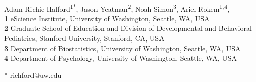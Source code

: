 \documentclass[10pt,letterpaper]{article}
\begin{document}
\vspace*{0.2in}

\begin{flushleft}
{\Large
\textbf{} %
}
\newline
\\
Adam Richie-Halford\textsuperscript{1*},
Jason Yeatman\textsuperscript{2},
Noah Simon\textsuperscript{3},
Ariel Rokem\textsuperscript{1,4},
\\
\bigskip
\textbf{1} eScience Institute, University of Washington, Seattle, WA, USA
\\
\textbf{2} Graduate School of Education and Division of Developmental and Behavioral Pediatrics, Stanford University, Stanford, CA, USA
\\
\textbf{3} Department of Biostatistics, University of Washington, Seattle, WA, USA
\\
\textbf{4} Department of Psychology, University of Washington, Seattle, WA, USA
\\
\bigskip

* richford@uw.edu

\end{flushleft}

\newcommand*{\alsLRatio}{$0.21$}
\newcommand*{\whLRatio}{$0.83$}
\newcommand*{\hbnLRatio}{$0.67$}
\newcommand*{\ccLRatio}{$0.68$}
\newcommand*{\alsLRatioGpca}{$0.4$}
\newcommand*{\whLRatioGpca}{$0.94$}
\newcommand*{\hbnLRatioGpca}{$0.82$}
\newcommand*{\ccLRatioGpca}{$0.8$}
\newcommand*{\alsAccuracy}{$83$}
\newcommand*{\alsRocAuc}{$0.88$}
\newcommand*{\alsAccuracyGpca}{$88$}
\newcommand*{\alsRocAucGpca}{$0.9$}
\newcommand*{\whRsq}{$0.52$}
\newcommand*{\whMae}{$2.67$}
\newcommand*{\hbnRsq}{$0.57$}
\newcommand*{\hbnMae}{$1.45$}
\newcommand*{\camcanRsq}{$0.77$}
\newcommand*{\camcanMae}{$6.02$}
\newcommand*{\whgpcaRsq}{$0.51$}
\newcommand*{\whgpcaMae}{$3.13$}
\newcommand*{\hbngpcaRsq}{$0.41$}
\newcommand*{\hbngpcaMae}{$1.61$}
\newcommand*{\camcangpcaRsq}{$0.68$}
\newcommand*{\camcangpcaMae}{$7.82$}
\end{document}
